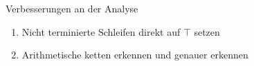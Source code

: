 \begin{frame}{Verbesserungen an der Analyse}
\begin{enumerate}
    \item Nicht terminierte Schleifen direkt auf $\top$ setzen
	\item Arithmetische ketten erkennen und genauer erkennen
\end{enumerate}
\end{frame}